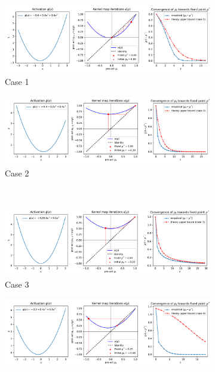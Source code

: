 \documentclass[twoside]{article}
\theoremstyle{definition}
\begin{document}
\begin{figure}[ht]
    \centering
    \begin{subfigure}[b]{0.7\textwidth}
        \centering
        \includegraphics[width=\textwidth]{./kernel_map_convergence_case_0.pdf}
        \caption{\small Case 1}
    \end{subfigure}
    \hfill
    \begin{subfigure}[b]{0.7\textwidth}
        \centering
        \includegraphics[width=\textwidth]{./kernel_map_convergence_case_1.pdf}
        \caption{\small Case 2}
    \end{subfigure}
    \\
    \begin{subfigure}[b]{0.7\textwidth}
        \centering
        \includegraphics[width=\textwidth]{./kernel_map_convergence_case_2.pdf}
        \caption{\small Case 3}
    \end{subfigure}
    \hfill
    \begin{subfigure}[b]{0.7\textwidth}
        \centering
        \includegraphics[width=\textwidth]{./kernel_map_convergence_case_3.pdf}

\end{subfigure}
\end{figure}
\end{document}
